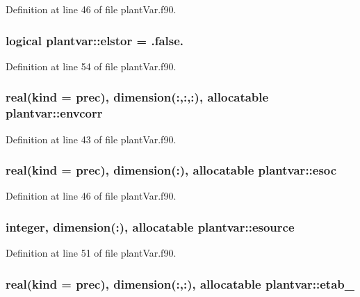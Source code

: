 Definition at line 46 of file plant\-Var.\-f90.

\hypertarget{classplantvar_a269d2dde89a5632bf0e3d0162c2368c0}{
\subsubsection[{elstor}]{\setlength{\rightskip}{0pt plus 5cm}logical plantvar\-::elstor = .false.}}\label{classplantvar_a269d2dde89a5632bf0e3d0162c2368c0}


Definition at line 54 of file plant\-Var.\-f90.

\hypertarget{classplantvar_a187eaf8e3b46428daf4b89db350aa0f1}{
\subsubsection[{envcorr}]{\setlength{\rightskip}{0pt plus 5cm}real(kind = prec), dimension(\-:,\-:,\-:), allocatable plantvar\-::envcorr}}\label{classplantvar_a187eaf8e3b46428daf4b89db350aa0f1}


Definition at line 43 of file plant\-Var.\-f90.

\hypertarget{classplantvar_a52a6a33ef0efbd1e6b19c59c683db54a}{
\subsubsection[{esoc}]{\setlength{\rightskip}{0pt plus 5cm}real(kind = prec), dimension(\-:), allocatable plantvar\-::esoc}}\label{classplantvar_a52a6a33ef0efbd1e6b19c59c683db54a}


Definition at line 46 of file plant\-Var.\-f90.

\hypertarget{classplantvar_ac5590ecfa29690829feb06fd8c1eb839}{
\subsubsection[{esource}]{\setlength{\rightskip}{0pt plus 5cm}integer, dimension(\-:), allocatable plantvar\-::esource}}\label{classplantvar_ac5590ecfa29690829feb06fd8c1eb839}


Definition at line 51 of file plant\-Var.\-f90.

\hypertarget{classplantvar_a4307773fae45ef7c05c590189ae40c32}{
\subsubsection[{etab\-\_\-}]{\setlength{\rightskip}{0pt plus 5cm}real(kind = prec), dimension(\-:,\-:), allocatable plantvar\-::etab\-\_\-}}\label{classplantvar_a4307773fae45ef7c05c590189ae40c32}


